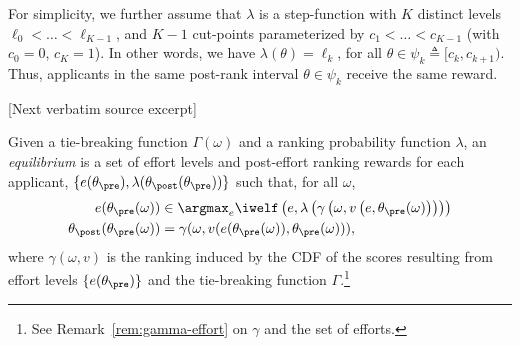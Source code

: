 \documentclass[10pt]{article}
\begin{document}
\begin{ReviewVerbatim}
For simplicity, we further assume that $\lambda$ is a step-function with $K$ distinct levels $\ell_0 < \dots < \ell_{K-1}$, and $K-1$ cut-points parameterized by $c_1< \dots < c_{K-1}$ (with $c_0 = 0$, $c_K = 1$). %
In other words, we have $\lambda(\theta) = \ell_k$, for all $\theta \in \psi_k \triangleq [c_{k}, c_{k+1})$. Thus, applicants in the same post-rank interval $\theta \in \psi_k$ receive the same reward.

[Next verbatim source excerpt]

\begin{definition} [Equilibrium]\label{def:equi}
{Given a}
tie-breaking function $\Gamma(\omega)$
%
{and}
	a ranking probability function $\lambda$, an \textit{equilibrium} is a set of effort levels and post-effort ranking rewards for each applicant, $\{e(\theta_\pre),  \lambda(\theta_\post(\theta_\pre))\}$ such that, for all
	$\omega$, %
	\begin{align*}
		e(\theta_\pre(\omega)) &\in \argmax_{e} \iwelf\left(e, \lambda\left(\gamma\left(\omega, v\left(e,\theta_\pre(\omega)\right)\right)\right)\right) %
		\\
		\theta_\post(\theta_\pre(\omega)) &= \gamma(\omega, v(e(\theta_\pre(\omega)),\theta_\pre(\omega))),
	\end{align*}
	{where $\gamma(\omega,v)$ is the ranking induced by the CDF of the scores resulting from effort levels $\{e(\theta_\pre)\}$ and the tie-breaking function $\Gamma$.\footnote{See Remark~\ref{rem:gamma-effort} on $\gamma$ and the set of efforts.%
}}
\end{definition}
\end{ReviewVerbatim}
\end{document}
